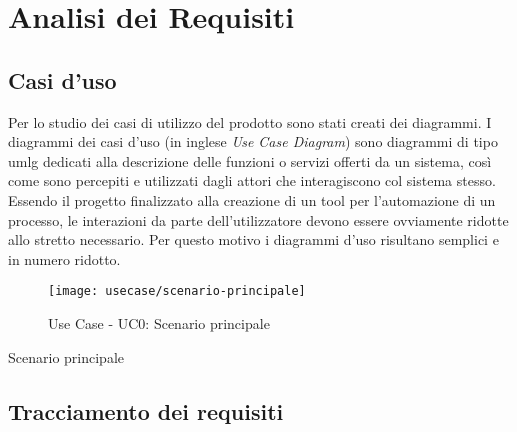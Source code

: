 \section{Analisi dei Requisiti}

	\subsection{Casi d'uso}
	
	Per lo studio dei casi di utilizzo del prodotto sono stati creati dei diagrammi.
	I diagrammi dei casi d'uso (in inglese \emph{Use Case Diagram}) sono diagrammi di tipo \gls{umlg} dedicati alla descrizione delle funzioni o servizi offerti da un sistema, così come sono percepiti e utilizzati dagli attori che interagiscono col sistema stesso.
	Essendo il progetto finalizzato alla creazione di un tool per l'automazione di un processo, le interazioni da parte dell'utilizzatore devono essere ovviamente ridotte allo stretto necessario. Per questo motivo i diagrammi d'uso risultano semplici e in numero ridotto.
	
	\begin{figure}[!h] 
		\centering 
		\texttt{[image: usecase/scenario-principale]} 
		\caption{Use Case - UC0: Scenario principale}
	\end{figure}
	
	\begin{usecase}{0}{Scenario principale}
		\label{uc:scenario-principale}
	\end{usecase}
	
	\subsection{Tracciamento dei requisiti}
	
